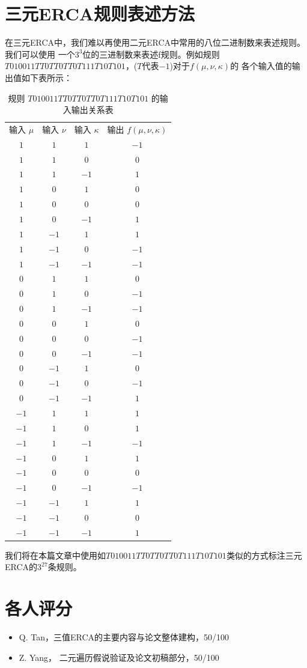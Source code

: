 \documentclass[reprint, amsmath, amssymb, aps, physrev,prb]{revtex4-2}
\begin{document}
\section{三元ERCA规则表述方法}
在三元ERCA中，我们难以再使用二元ERCA中常用的八位二进制数来表述规则。我们可以使用
一个$3^3$位的三进制数来表述f规则。例如规则$T010011TT0TT0TT0T111T10T101$，($T$代表$-1$)对于$f(\mu,\nu,\kappa)$的
各个输入值的输出值如下表所示：
\begin{table}[ht]
\caption{\label{tab:ternary_rule} 规则 $T01 001 1TT 0TT 0TT 0T1 11T 10T 101$ 的输入输出关系表}
\begin{ruledtabular}
\begin{tabular}{cccc}
输入 $\mu$ & 输入 $\nu$ & 输入 $\kappa$ & 输出 $f(\mu,\nu,\kappa)$ \\
\colrule
$1$ & $1$ & $1$ & $-1$ \\
$1$ & $1$ & $0$ & $0$ \\
$1$ & $1$ & $-1$ & $1$ \\
$1$ & $0$ & $1$ & $0$ \\
$1$ & $0$ & $0$ & $0$ \\
$1$ & $0$ & $-1$ & $1$ \\
$1$ & $-1$ & $1$ & $1$ \\
$1$ & $-1$ & $0$ & $-1$ \\
$1$ & $-1$ & $-1$ & $-1$ \\
$0$ & $1$ & $1$ & $0$ \\
$0$ & $1$ & $0$ & $-1$ \\
$0$ & $1$ & $-1$ & $-1$ \\
$0$ & $0$ & $1$ & $0$ \\
$0$ & $0$ & $0$ & $-1$ \\
$0$ & $0$ & $-1$ & $-1$ \\
$0$ & $-1$ & $1$ & $0$ \\
$0$ & $-1$ & $0$ & $-1$ \\
$0$ & $-1$ & $-1$ & $1$ \\
$-1$ & $1$ & $1$ & $1$ \\
$-1$ & $1$ & $0$ & $1$ \\
$-1$ & $1$ & $-1$ & $-1$ \\
$-1$ & $0$ & $1$ & $1$ \\
$-1$ & $0$ & $0$ & $0$ \\
$-1$ & $0$ & $-1$ & $-1$ \\
$-1$ & $-1$ & $1$ & $1$ \\
$-1$ & $-1$ & $0$ & $0$ \\
$-1$ & $-1$ & $-1$ & $1$ \\
\end{tabular}
\end{ruledtabular}
\end{table}

我们将在本篇文章中使用如$T010011TT0TT0TT0T111T10T101$类似的方式标注三元ERCA的$3^{27}$条规则。

\section{各人评分}
\begin{itemize}
    \item Q. Tan，三值ERCA的主要内容与论文整体建构，50/100
    \item Z. Yang， 二元遍历假说验证及论文初稿部分，50/100
\end{itemize}
\end{document}
